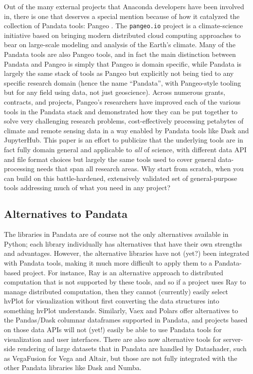 Out of the many external projects that Anaconda developers have been involved in, there is one that deserves a special mention because of how it catalyzed the collection of Pandata tools: Pangeo \cite{odaka:tthpc20}. The \texttt{pangeo.io} project is a climate-science initiative based on bringing modern distributed cloud computing approaches to bear on large-scale modeling and analysis of the Earth's climate. Many of the Pandata tools are also Pangeo tools, and in fact the main distinction between Pandata and Pangeo is simply that Pangeo is domain specific, while Pandata is largely the same stack of tools as Pangeo but explicitly not being tied to any specific research domain (hence the name ``Pandata'', with Pangeo-style tooling but for any field using data, not just geoscience). Across numerous grants, contracts, and projects, Pangeo's researchers have improved each of the various tools in the Pandata stack and demonstrated how they can be put together to solve very challenging research problems, cost-effectively processing petabytes of climate and remote sensing data in a way enabled by Pandata tools like Dask and JupyterHub. This paper is an effort to publicize that the underlying tools are in fact fully domain general and applicable to \emph{all} of science, with different data API and file format choices but largely the same tools used to cover general data-processing needs that span all research areas. Why start from scratch, when you can build on this battle-hardened, extensively validated set of general-purpose tools addressing much of what you need in any project?

\subsection{Alternatives to Pandata}

The libraries in Pandata are of course not the only alternatives available in Python; each library individually has alternatives that have their own strengths and advantages. However, the alternative libraries have not (yet?) been integrated with Pandata tools, making it much more difficult to apply them to a Pandata-based project. For instance, Ray \cite{moritz:arxiv18} is an alternative approach to distributed computation that is not supported by these tools, and so if a project uses Ray to manage distributed computation, then they cannot (currently) easily select hvPlot for visualization without first converting the data structures into something hvPlot understands. Similarly, Vaex \cite{breddels:aaa18} and Polars \cite{ritche:polars} offer alternatives to the Pandas/Dask columnar dataframes supported in Pandata, and projects based on those data APIs will not (yet!) easily be able to use Pandata tools for visualization and user interfaces. There are also now alternative tools for server-side rendering of large datasets that in Pandata are handled by Datashader, such as VegaFusion for Vega and Altair, but those are not fully integrated with the other Pandata libraries like Dask and Numba.

